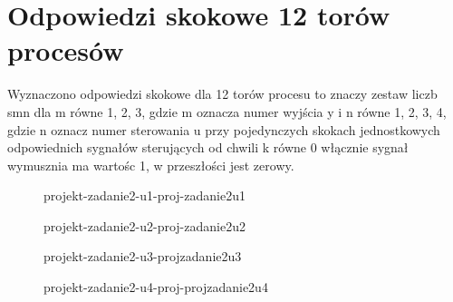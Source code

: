\section{Odpowiedzi skokowe 12 torów procesów}
\label{projekt:zad2}


Wyznaczono odpowiedzi skokowe dla 12 torów procesu to znaczy zestaw liczb smn dla m równe 1, 2, 3, 
gdzie m oznacza numer wyjścia y i n równe 1, 2, 3, 4, 
gdzie n oznacz numer sterowania u przy pojedynczych skokach jednostkowych odpowiednich sygnałów  sterujących
od chwili k równe 0 włącznie sygnał wymusznia ma wartośc 1, 
w przeszłości jest zerowy.

\begin{figure}[H] 
    \centering
    
    \caption{projekt-zadanie2-u1-proj-zadanie2u1}
    \label{projekt:zad2:figure:projzadanie2u1}
 \end{figure}

 \begin{figure}[H] 
     \centering
     
     \caption{projekt-zadanie2-u2-proj-zadanie2u2}
     \label{projekt:zad2:figure:projzadanie2u2}
  \end{figure}

  \begin{figure}[H] 
      \centering
      
      \caption{projekt-zadanie2-u3-projzadanie2u3}
      \label{projekt:zad2:figure:projzadanie2u3}
   \end{figure}

   \begin{figure}[H] 
       \centering
       
       \caption{projekt-zadanie2-u4-proj-projzadanie2u4}
       \label{projekt:zad2:figure:projzadanie2u4}
    \end{figure}

\newpage
